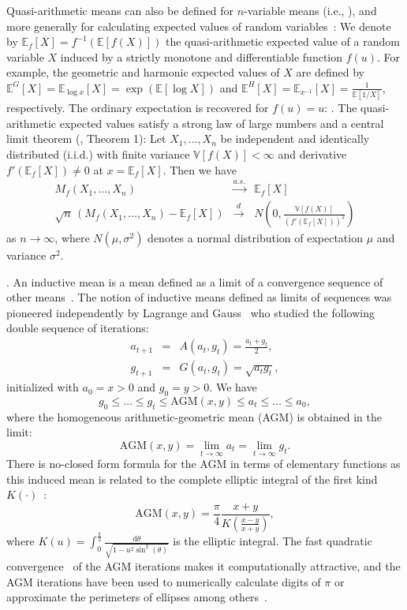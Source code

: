 \documentclass{article}
\def\correction#1{{\color{red}{#1}}}
\def\AGM{\mathrm{AGM}}
\def\bbE{\mathbb{E}}
\def\bbV{\mathbb{V}}
\begin{document}
Quasi-arithmetic means can also be defined for $n$-variable means 
(i.e., \correction{$M_f(x_1,\ldots,x_n)=f^{-1}(\frac{1}{n}\sum_{i=1}^n f(x_i))$}), and more generally for calculating expected values of random variables~\cite{de2016mean}: 
We denote by $\bbE_f[X]=f^{-1}(\bbE[f(X)])$ 
the quasi-arithmetic expected value of a random variable $X$ induced by a strictly monotone and differentiable function $f(u)$.
For example, the geometric and harmonic expected values of $X$ are defined  by
$\bbE^G[X]=\bbE_{\log x}[X]=\exp(\bbE[\log X])$ and $\bbE^H[X]=\bbE_{x^{-1}}[X]=\frac{1}{\bbE[1/X]}$, respectively.
The ordinary expectation is recovered for $f(u)=u$: \correction{$\bbE^A[X]=\bbE_x[X]=\bbE[X]$}. 
The quasi-arithmetic expected values satisfy a  strong law of large numbers and a central limit theorem (\cite{de2016mean}, Theorem 1):
Let $X_1,\ldots, X_n$ be independent and identically distributed (i.i.d.) with finite variance $\bbV[f(X)]<\infty$ 
and derivative $f'(\bbE_f[X])\not =0$ at $x=\bbE_f[X]$.
Then we have 
\begin{eqnarray*}
M_f(X_1,\ldots, X_n) &\stackrel{a.s.}{\longrightarrow}& \bbE_f[X]\\
\sqrt{n} \, \left(M_f(X_1,\ldots, X_n)-\bbE_f[X]\right)  &\stackrel{d}{\longrightarrow}& N\left(0, \frac{\bbV[f(X)]}{\left(f'(\bbE_f[X])\right)^2} \right) 
\end{eqnarray*}
as $n\rightarrow\infty$, where $N(\mu,\sigma^2)$ denotes a normal distribution of expectation $\mu$ and variance $\sigma^2$.

\vskip 0.3cm
.
An inductive mean is a mean defined as a limit of a convergence sequence of other means~\cite{sturm2003probability}.
The notion of inductive means defined as limits of sequences was pioneered independently by Lagrange and Gauss~\cite{borwein1987pi} who studied the following double sequence of iterations: 
\begin{eqnarray*}
a_{t+1} &=& A(a_t,g_t)=\frac{a_t+g_t}{2},\\
g_{t+1} &=& G(a_t,g_t)=\sqrt{a_tg_t},
\end{eqnarray*}
initialized with $a_0=x>0$ and $g_0=y>0$.
We have
$$
g_0\leq \ldots\leq g_t\leq \AGM(x,y)\leq a_t\leq \ldots\leq a_0,
$$
where the homogeneous arithmetic-geometric mean (AGM) is obtained in the limit: 
$$
\AGM(x,y)=\lim_{t\rightarrow\infty} a_t=\lim_{t\rightarrow\infty} g_t.
$$
There is no-closed form formula for the AGM in terms of elementary functions as this induced mean  
 is related to the complete elliptic integral of the first kind $K(\cdot)$~\cite{borwein1987pi}:
$$
\AGM(x,y)=\frac{\pi}{4} \frac{x+y}{K\left(\frac{x-y}{x+y}\right)},
$$
where $K(u)=\int_0^{\frac{\pi}{2}} \frac{\mathrm{d}\theta}{\sqrt{1-u^2\sin^2(\theta)}}$ is the elliptic integral.
The fast quadratic convergence~\cite{ArchimedeanDoubleSequence-1984} of the AGM iterations makes it computationally attractive, and the AGM iterations have been used to numerically calculate digits of $\pi$ or approximate the perimeters of ellipses among others~\cite{borwein1987pi}.
\end{document}
